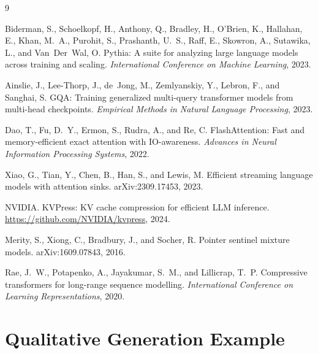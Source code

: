 \documentclass{article}
\begin{document}
\clearpage

{\small

\begin{thebibliography}{9}

Biderman, S., Schoelkopf, H., Anthony, Q., Bradley, H., O'Brien, K., Hallahan, E., Khan, M.~A., Purohit, S., Prashanth, U.~S., Raff, E., Skowron, A., Sutawika, L., and Van~Der~Wal, O.
\newblock Pythia: A suite for analyzing large language models across training and scaling.
\newblock \emph{International Conference on Machine Learning}, 2023.

Ainslie, J., Lee-Thorp, J., de~Jong, M., Zemlyanskiy, Y., Lebron, F., and Sanghai, S.
\newblock GQA: Training generalized multi-query transformer models from multi-head checkpoints.
\newblock \emph{Empirical Methods in Natural Language Processing}, 2023.

Dao, T., Fu, D.~Y., Ermon, S., Rudra, A., and Re, C.
\newblock FlashAttention: Fast and memory-efficient exact attention with IO-awareness.
\newblock \emph{Advances in Neural Information Processing Systems}, 2022.

Xiao, G., Tian, Y., Chen, B., Han, S., and Lewis, M.
\newblock Efficient streaming language models with attention sinks.
\newblock arXiv:2309.17453, 2023.

NVIDIA.
\newblock KVPress: KV cache compression for efficient LLM inference.
\newblock \url{https://github.com/NVIDIA/kvpress}, 2024.

Merity, S., Xiong, C., Bradbury, J., and Socher, R.
\newblock Pointer sentinel mixture models.
\newblock arXiv:1609.07843, 2016.

Rae, J.~W., Potapenko, A., Jayakumar, S.~M., and Lillicrap, T.~P.
\newblock Compressive transformers for long-range sequence modelling.
\newblock \emph{International Conference on Learning Representations}, 2020.

\end{thebibliography}
}

\clearpage
\appendix
\section{Qualitative Generation Example}
\end{document}
